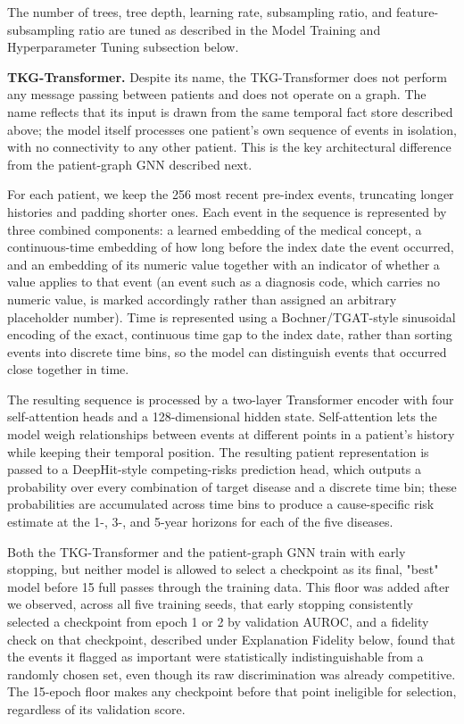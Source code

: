 The number of trees, tree depth, learning rate, subsampling ratio, and feature-subsampling ratio are tuned as described in the Model Training and Hyperparameter Tuning subsection below.

\textbf{TKG-Transformer.}
Despite its name, the TKG-Transformer does not perform any message passing between patients and does not operate on a graph. The name reflects that its input is drawn from the same temporal fact store described above; the model itself processes one patient's own sequence of events in isolation, with no connectivity to any other patient. This is the key architectural difference from the patient-graph GNN described next.

For each patient, we keep the 256 most recent pre-index events, truncating longer histories and padding shorter ones. Each event in the sequence is represented by three combined components: a learned embedding of the medical concept, a continuous-time embedding of how long before the index date the event occurred, and an embedding of its numeric value together with an indicator of whether a value applies to that event (an event such as a diagnosis code, which carries no numeric value, is marked accordingly rather than assigned an arbitrary placeholder number). Time is represented using a Bochner/TGAT-style sinusoidal encoding of the exact, continuous time gap to the index date, rather than sorting events into discrete time bins, so the model can distinguish events that occurred close together in time.

The resulting sequence is processed by a two-layer Transformer encoder with four self-attention heads and a 128-dimensional hidden state. Self-attention lets the model weigh relationships between events at different points in a patient's history while keeping their temporal position. The resulting patient representation is passed to a DeepHit-style competing-risks prediction head, which outputs a probability over every combination of target disease and a discrete time bin; these probabilities are accumulated across time bins to produce a cause-specific risk estimate at the 1-, 3-, and 5-year horizons for each of the five diseases.

Both the TKG-Transformer and the patient-graph GNN train with early stopping, but neither model is allowed to select a checkpoint as its final, "best" model before 15 full passes through the training data. This floor was added after we observed, across all five training seeds, that early stopping consistently selected a checkpoint from epoch 1 or 2 by validation AUROC, and a fidelity check on that checkpoint, described under Explanation Fidelity below, found that the events it flagged as important were statistically indistinguishable from a randomly chosen set, even though its raw discrimination was already competitive. The 15-epoch floor makes any checkpoint before that point ineligible for selection, regardless of its validation score.

